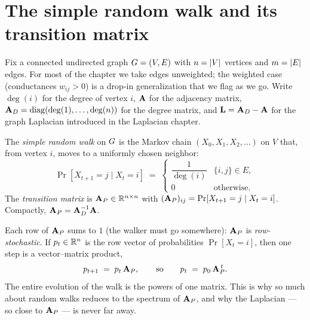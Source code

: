 \chapterline

\section{The simple random walk and its transition matrix}

Fix a connected undirected graph $G=(V,E)$ with $n=\lvert V\rvert$ vertices and $m=\lvert E\rvert$ edges. For most of the chapter we take edges unweighted; the weighted case (conductances $w_{ij}>0$) is a drop-in generalization that we flag as we go. Write $\deg(i)$ for the degree of vertex $i$, $\mathbf{A}$ for the adjacency matrix, $\mathbf{A}_D=\mathrm{diag}(\deg(1),\dots,\deg(n))$ for the degree matrix, and $\mathbf{L}=\mathbf{A}_D-\mathbf{A}$ for the graph Laplacian introduced in the Laplacian chapter.

\begin{definition}\label{ch35:def-srw}
The \emph{simple random walk} on $G$ is the Markov chain $(X_0,X_1,X_2,\dots)$ on $V$ that, from vertex $i$, moves to a uniformly chosen neighbor:
\[
  \Pr[X_{t+1}=j \mid X_t=i] \;=\;
  \begin{cases} \dfrac{1}{\deg(i)} & \{i,j\}\in E,\\[4pt] 0 & \text{otherwise.}\end{cases}
\]
The \emph{transition matrix} is $\mathbf{A}_P \in \mathbb{R}^{n\times n}$ with $(\mathbf{A}_P)_{ij}=\Pr[X_{t+1}=j\mid X_t=i]$. Compactly, $\mathbf{A}_P = \mathbf{A}_D^{-1}\mathbf{A}$.
\end{definition}

Each row of $\mathbf{A}_P$ sums to $1$ (the walker must go somewhere): $\mathbf{A}_P$ is \emph{row-stochastic}. If $p_t \in \mathbb{R}^{n}$ is the row vector of probabilities $\Pr[X_t=i]$, then one step is a vector--matrix product,
\[
  p_{t+1} \;=\; p_t \,\mathbf{A}_P, \qquad\text{so}\qquad p_t \;=\; p_0\,\mathbf{A}_P^{\,t}.
\]
The entire evolution of the walk is the powers of one matrix. This is why so much about random walks reduces to the spectrum of $\mathbf{A}_P$, and why the Laplacian --- so close to $\mathbf{A}_P$ --- is never far away.

